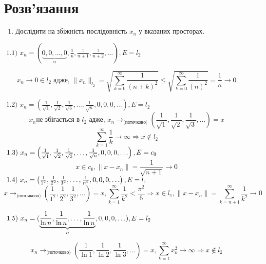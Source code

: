 \section*{Розв'язання}
\begin{tcolorbox}[title=Завдлання 1]

    \begin{enumerate}
        \item Дослідити на збіжність послідовність $x_{n}$ у вказаних просторах.
    \end{enumerate}

    $\text { 1.1) } x_{n}= (\underbrace{0,0, \ldots, 0}_{n}, \frac{1}{n}, 
    \frac{1}{n+1}, \frac{1}{n+2}, \ldots), E=l_{2}$
    
    
    $$x_n \rightarrow 0 \in l_2 \text{ адже, } \|x_n\|_{l_2} = 
    \sqrt{\sum_{k=0}^{\infty} \frac{1}{(n+k)^2}} \leq 
    \sqrt{\sum_{k=0}^{\infty} \frac{1}{(n)^2}} = \frac{1}{n} \rightarrow 0 $$

    $
    \text { 1.2) } x_{n}=(\frac{1}{\sqrt{1}}, \frac{1}{\sqrt{2}}, 
    \frac{1}{\sqrt{3}}, \ldots, \frac{1}{\sqrt{n}}, 0,0,0, \ldots), E=l_{2}$
    $$
    x_n \text{не збігається в }  l_2 \text{ адже, }
    x_n \rightarrow_{\text{(поточково)}} (\frac{1}{\sqrt{1}}, 
    \frac{1}{\sqrt{2}}, \frac{1}{\sqrt{3}}, \ldots) = x
    $$
    $$
    \sum_{k=1}^{\infty} \frac{1}{k}  \rightarrow \infty \Rightarrow 
    x \notin l_2
    $$
    $
    \text { 1.3) } x_{n}=\left(\frac{1}{\sqrt{1}}, \frac{1}{\sqrt{2}}, \frac{1}{\sqrt{3}}, \ldots, \frac{1}{\sqrt{n}}, 0,0,0, \ldots\right), E=c_{0} \\
    $
    $$x \in c_0, \|x - x_n\| = \frac{1}{\sqrt{n + 1}} \rightarrow 0 $$
    $ 
    \text { 1.4) } x_{n}=\left(\frac{1}{1^{2}}, \frac{1}{2^{2}}, \frac{1}{3^{2}}, \ldots, \frac{1}{n^{2}}, 0,0,0, \ldots\right), E=l_{1} \\
    $
    $$
    x \rightarrow_{\text{(поточково)}} (\frac{1}{1^{2}}, \frac{1}{2^{2}}, \frac{1}{3^{2}}, \ldots) = x, \sum_{k=1}^{\infty} \frac{1}{k^{2}}<\frac{\pi^2}{6} 
    \Rightarrow x \in l_{1}, \|x - x_n\| = \sum_{k=n+1}^{\infty}\frac{1}{k^2}
    \rightarrow 0
    $$

    $
    \text { 1.5) } x_{n}=(\underbrace{\frac{1}{\ln n}, \frac{1}{\ln n}, \ldots, \frac{1}{\ln n}}_{n}, 0,0,0, \ldots), E=l_{2} \\
    $

    $$
    x_n \rightarrow_{\text{(поточково)}} (\frac{1}{\ln 1}, \frac{1}{\ln 2}, \frac{1}{\ln 3}, \ldots) = x, \sum_{k=1}^{\infty} x_k^2 \rightarrow \infty 
    \Rightarrow x \notin l_2
    $$
    

\end{tcolorbox}
